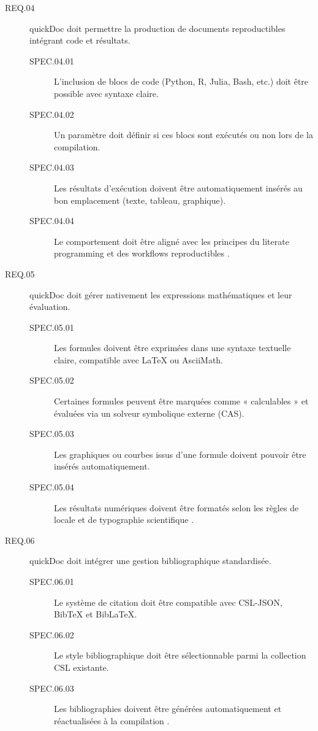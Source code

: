 \documentclass[a4paper,12pt]{article}
\begin{document}
\begin{description}
\item[{\label{orgcb78327}REQ.04}] quickDoc doit permettre la production de documents reproductibles intégrant code et résultats.
\begin{description}
\item[{\label{org3888e80}SPEC.04.01}] L’inclusion de blocs de code (Python, R, Julia, Bash, etc.) doit être possible avec syntaxe claire.
\item[{\label{org3506087}SPEC.04.02}] Un paramètre doit définir si ces blocs sont exécutés ou non lors de la compilation.
\item[{\label{org18a57fb}SPEC.04.03}] Les résultats d’exécution doivent être automatiquement insérés au bon emplacement (texte, tableau, graphique).
\item[{\label{org7712a40}SPEC.04.04}] Le comportement doit être aligné avec les principes du literate programming et des workflows reproductibles \autocite{haghishMarkdocLiterateProgramming2016,holmesReproducibleManuscriptPreparation2021}.
\end{description}

\item[{\label{orga8a2a0f}REQ.05}] quickDoc doit gérer nativement les expressions mathématiques et leur évaluation.
\begin{description}
\item[{\label{org63ebb2e}SPEC.05.01}] Les formules doivent être exprimées dans une syntaxe textuelle claire, compatible avec \LaTeX{} ou AsciiMath.
\item[{\label{org8fb934f}SPEC.05.02}] Certaines formules peuvent être marquées comme « calculables » et évaluées via un solveur symbolique externe (CAS).
\item[{\label{org6b2064e}SPEC.05.03}] Les graphiques ou courbes issus d’une formule doivent pouvoir être insérés automatiquement.
\item[{\label{orga408215}SPEC.05.04}] Les résultats numériques doivent être formatés selon les règles de locale et de typographie scientifique \autocite{schurovQqmbrIndentmlExtensible2017,kaliszykSurveyLanguagesFormalizing2020}.
\end{description}

\item[{\label{org3b6f8b5}REQ.06}] quickDoc doit intégrer une gestion bibliographique standardisée.
\begin{description}
\item[{\label{orge6e9f67}SPEC.06.01}] Le système de citation doit être compatible avec CSL-JSON, BibTeX et BibLaTeX.
\item[{\label{org99f6b5b}SPEC.06.02}] Le style bibliographique doit être sélectionnable parmi la collection CSL existante.
\item[{\label{org3143de0}SPEC.06.03}] Les bibliographies doivent être générées automatiquement et réactualisées à la compilation \autocite{johnmacfarlanePandocUsersGuide2025,cadavidDocumentationascodeInterfaceControl2022}.
\end{description}


\end{description}
\end{document}
